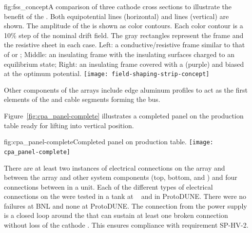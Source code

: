 \begin{dunefigure}{fig:fss_concept}{A comparison of three cathode cross sections to illustrate the benefit of the . Both equipotential lines (horizontal) and \efield{} lines (vertical) are shown.  The amplitude of the \efield{} is shown as color contours. Each color contour is a 10\% step of the nominal drift field.  The gray rectangles represent the frame and the resistive sheet in each case. Left: a conductive/resistive frame similar to that of  or ; Middle: an insulating frame with the insulating surfaces charged to an equilibrium state; Right: an insulating frame covered with a  (purple) and biased at the optimum potential. }
\texttt{[image: field-shaping-strip-concept]} %
\end{dunefigure}

Other  components of the  arrays include  edge aluminum profiles to act as the first elements of the  and cable segments forming the  bus.

Figure~\ref{fig:cpa_panel-complete} illustrates a completed   panel on the production table ready for lifting into vertical position. %

\begin{dunefigure}{fig:cpa_panel-complete}{Completed   panel on production table.}
\texttt{[image: cpa\_panel-complete]}
\end{dunefigure}

There are at least two instances of electrical connections on the  array and between the  array and other  system components (top, bottom, and ) and four connections between  in a  unit.  Each of the different types of electrical connections on the  were tested in a  tank at ~\cite{bib:docdb2338}  and in ProtoDUNE. There were no failures at BNL and none at ProtoDUNE.  The  connection from the  power supply is a closed loop around the  that can sustain at least one broken connection without loss of the cathode .  This ensures compliance with requirement SP-HV-2.

